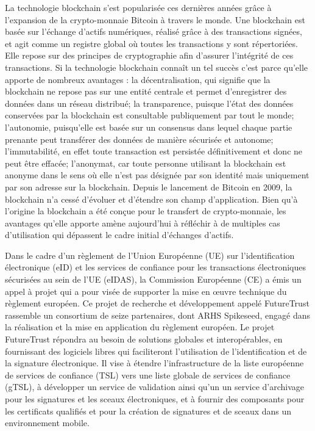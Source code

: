 \documentclass{tnreport}
\begin{document}
La technologie blockchain s'est popularisée ces dernières années grâce à l'expansion de la crypto-monnaie Bitcoin à travers le monde. 
Une blockchain est basée sur l'échange d'actifs numériques, réalisé grâce à des transactions signées, et agit comme un registre global où toutes les transactions y sont répertoriées. Elle repose sur des principes de cryptographie afin d'assurer l'intégrité de ces transactions.
Si la technologie blockchain connaît un tel succès c'est parce qu'elle apporte de nombreux avantages : 
la décentralisation, qui signifie que la blockchain ne repose pas sur une entité centrale et permet d'enregistrer des données dans un réseau distribué; 
la transparence, puisque l'état des données conservées par la blockchain est consultable publiquement par tout le monde; 
l'autonomie, puisqu'elle est basée sur un consensus dans lequel chaque partie prenante peut transférer des données de manière sécurisée et autonome;
l'immutabilité, en effet toute transaction est persistée définitivement et donc ne peut être effacée;
l'anonymat, car toute personne utilisant la blockchain est anonyme dans le sens où elle n'est pas désignée par son identité mais uniquement par son adresse sur la blockchain.
Depuis le lancement de Bitcoin en 2009, la blockchain n'a cessé d'évoluer et d'étendre son champ d'application.
Bien qu'à l'origine la blockchain a été conçue pour le transfert de crypto-monnaie, les avantages qu'elle apporte amène aujourd'hui à réfléchir à de multiples cas d'utilisation qui dépassent le cadre initial d'échanges d'actifs.


Dans le cadre d'un règlement de l'Union Européenne (UE) sur l'identification électronique (eID) et les services de confiance pour les transactions électroniques sécurisées au sein de l'UE (eIDAS), la Commission Européenne (CE) a émis un appel à projet qui a pour visée de supporter la mise en œuvre technique du règlement européen. 
Ce projet de recherche et développement appelé FutureTrust rassemble un consortium de seize partenaires, dont ARHS Spikeseed, engagé dans la réalisation et la mise en application du règlement européen. 
Le projet FutureTrust répondra au besoin de solutions globales et interopérables, en fournissant des logiciels libres qui faciliteront l'utilisation de l'identification et de la signature électronique. 
Il vise à étendre l'infrastructure de la liste européenne de services de confiance (TSL) vers une liste globale de services de confiance (gTSL), à développer un service de validation ainsi qu'un un service d'archivage pour les signatures et les sceaux électroniques, et à fournir des composants pour les certificats qualifiés et pour la création de signatures et de sceaux dans un environnement mobile.
\end{document}
